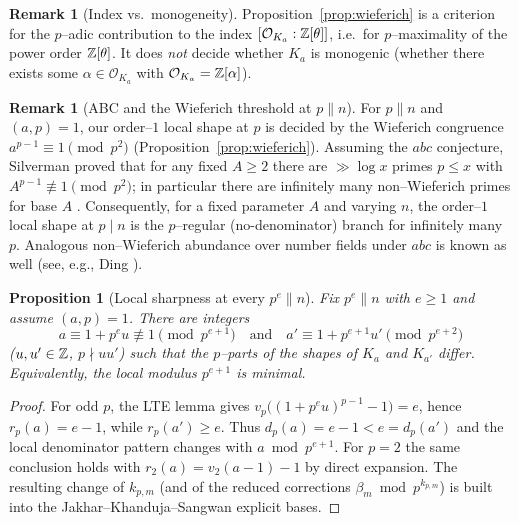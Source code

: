 \documentclass[12pt,a4paper,oneside]{amsart}
\newtheorem{proposition}[theorem]{Proposition}
\theoremstyle{definition}
\newtheorem{remark}[theorem]{Remark}
\begin{document}
\begin{remark}[Index vs.\ monogeneity]\label{rem:index-vs-monogeneity}
Proposition~\ref{prop:wieferich} is a criterion for the $p$--adic contribution to the index
$[\mathcal O_{K_a}:\Bbb Z[\theta]]$, i.e.\ for $p$--maximality of the power order $\Bbb Z[\theta]$. It does \emph{not} decide whether $K_a$ is monogenic (whether there exists some $\alpha\in\mathcal O_{K_a}$ with $\mathcal O_{K_a}=\Bbb Z[\alpha]$).
\end{remark}


\begin{remark}[ABC and the Wieferich threshold at $p\parallel n$]
For $p\parallel n$ and $(a,p)=1$, our order--$1$ local shape at $p$ is decided by the
Wieferich congruence $a^{p-1}\equiv1\pmod{p^2}$ (Proposition~\ref{prop:wieferich}). 
Assuming the $abc$ conjecture, Silverman proved that for any fixed $A\ge2$ there are 
$\gg\log x$ primes $p\le x$ with $A^{p-1}\not\equiv1\pmod{p^2}$; in particular there are 
infinitely many non--Wieferich primes for base $A$ \cite{Silverman88}. Consequently, for a fixed parameter $A$ and varying $n$, the order--$1$ local shape at $p\mid n$ is the $p$--regular (no-denominator) branch for infinitely many $p$. 
Analogous non--Wieferich abundance over number fields under $abc$ is known as well (see, e.g., Ding \cite{Ding19}).
\end{remark}


\begin{proposition}[Local sharpness at every \(p^e\parallel n\)]\label{prop:local-sharpness}
Fix $p^e\parallel n$ with $e\ge1$ and assume $(a,p)=1$.  There are integers
\[
a\equiv 1+p^{e}u\not\equiv 1\pmod{p^{e+1}}\quad\text{and}\quad
a'\equiv 1+p^{e+1}u'\pmod{p^{e+2}}
\]
($u,u'\in\Bbb Z$, $p\nmid uu'$) such that the $p$–parts of the shapes of $K_a$ and $K_{a'}$
differ.  Equivalently, the local modulus $p^{e+1}$ is minimal.
\end{proposition}

\begin{proof}
For odd $p$, the LTE lemma gives
$v_p\bigl((1+p^{e}u)^{p-1}-1\bigr)=e$, hence $r_p(a)=e-1$, while $r_p(a')\ge e$.
Thus $d_p(a)=e-1<e=d_p(a')$ and the local denominator pattern changes with $a\bmod
p^{e+1}$.  For $p=2$ the same conclusion holds with $r_2(a)=v_2(a-1)-1$ by direct
expansion.  The resulting change of $k_{p,m}$ (and of the reduced corrections
$\beta_m\bmod p^{k_{p,m}}$) is built into the Jakhar--Khanduja--Sangwan explicit bases.
\end{proof}
\end{document}
